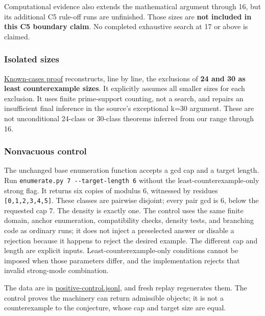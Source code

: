 \documentclass[11pt,a4paper]{article}
\begin{document}
Computational evidence also extends the mathematical argument through 16, but its additional C5 rule-off runs are unfinished. Those sizes are \textbf{not included in this C5 boundary claim}. No completed exhaustive search at 17 or above is claimed.

\subsubsection{Isolated sizes}\label{isolated-sizes}

\href{https://github.com/mpelteshki/climbing-to-the-frontier/blob/ed55f76eb8c558825bb629fd2cd8dbf46e5f1314/cagent/p4/c5/known-cases.md}{Known-cases proof} reconstructs, line by line, the exclusions of \textbf{24 and 30 as least counterexample sizes}. It explicitly assumes all smaller sizes for each exclusion. It uses finite prime-support counting, not a search, and repairs an insufficient final inference in the source's exceptional k=30 argument. These are not unconditional 24-class or 30-class theorems inferred from our range through 16.

\subsubsection{Nonvacuous control}\label{nonvacuous-control}

The unchanged base enumeration function accepts a gcd cap and a target length. Run \texttt{enumerate.py\ 7\ -\/-target-length\ 6} without the least-counterexample-only strong flag. It returns six copies of modulus 6, witnessed by residues \texttt{{[}0,1,2,3,4,5{]}}. These classes are pairwise disjoint; every pair gcd is 6, below the requested cap 7. The density is exactly one. The control uses the same finite domain, anchor enumeration, compatibility checks, density tests, and branching code as ordinary runs; it does not inject a preselected answer or disable a rejection because it happens to reject the desired example. The different cap and length are explicit inputs. Least-counterexample-only conditions cannot be imposed when those parameters differ, and the implementation rejects that invalid strong-mode combination.

The data are in \href{https://github.com/mpelteshki/climbing-to-the-frontier/blob/ed55f76eb8c558825bb629fd2cd8dbf46e5f1314/cagent/p4/audit/positive-control.jsonl}{positive-control.jsonl}, and fresh replay regenerates them. The control proves the machinery can return admissible objects; it is not a counterexample to the conjecture, whose cap and target size are equal.
\end{document}
